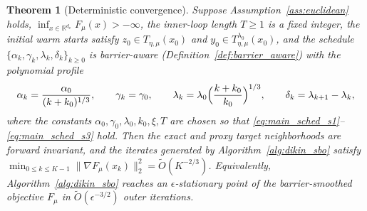 \documentclass{article}
\newtheorem{theorem}{Theorem}
\begin{document}
\begin{theorem}[Deterministic convergence]
\label{thm:deterministic_poly}
Suppose Assumption~\ref{ass:euclidean} holds, \(\inf_{x\in\mathbb R^{d_x}}F_\mu(x)>-\infty\),
the inner-loop length \(T\ge 1\) is a fixed integer, the initial warm starts satisfy
\(z_0\in T_{\eta,\mu}(x_0)\) and \(y_0\in T_{\eta,\mu}^{\lambda_0}(x_0)\), and the schedule
\(\{\alpha_k,\gamma_k,\lambda_k,\delta_k\}_{k\ge 0}\) is \textit{barrier-aware}
(Definition~\ref{def:barrier_aware}) with the polynomial profile
\begin{equation}
\label{eq:main_poly_schedule}
\alpha_k=\frac{\alpha_0}{(k+k_0)^{1/3}},
\qquad
\gamma_k=\gamma_0,
\qquad
\lambda_k=\lambda_0\Bigl(\frac{k+k_0}{k_0}\Bigr)^{1/3},
\qquad
\delta_k=\lambda_{k+1}-\lambda_k, \notag
\end{equation}
where the constants \(\alpha_0,\gamma_0,\lambda_0,k_0, \xi, T\) are chosen so that
\eqref{eq:main_sched_s1}--\eqref{eq:main_sched_s3} hold. Then the exact and proxy target neighborhoods are
forward invariant, and the iterates generated by Algorithm~\ref{alg:dikin_sbo} satisfy
\(\min_{0\le k\le K-1}\|\nabla F_\mu(x_k)\|_2^2=\widetilde O(K^{-2/3})\).
Equivalently, Algorithm~\ref{alg:dikin_sbo} reaches an \(\epsilon\)-stationary point of the barrier-smoothed objective
\(F_\mu\) in \(\widetilde O(\epsilon^{-3/2})\) outer iterations.
\end{theorem}
\end{document}
